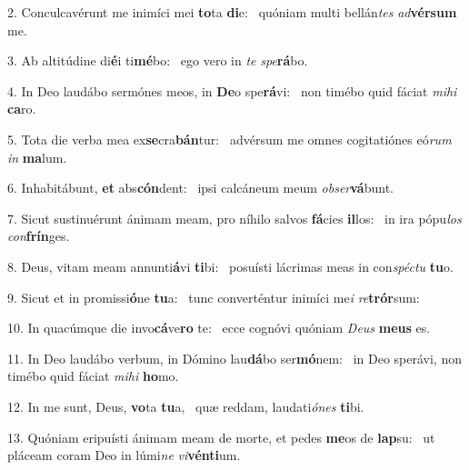 2. Conculcavérunt me inimíci mei \textbf{to}ta \textbf{di}e: \ast\  quóniam multi bellán\textit{tes} \textit{ad}\textbf{vér}\textbf{sum} me.\

3. Ab altitúdine di\textbf{é}i ti\textbf{mé}bo: \ast\  ego vero in \textit{te} \textit{spe}\textbf{rá}bo.\

4. In Deo laudábo sermónes meos, in \textbf{De}o spe\textbf{rá}vi: \ast\  non timébo quid fáciat \textit{mi}\textit{hi} \textbf{ca}ro.\

5. Tota die verba mea ex\textbf{se}cra\textbf{bán}tur: \ast\  advérsum me omnes cogitatiónes eó\textit{rum} \textit{in} \textbf{ma}lum.\

6. Inhabitábunt, \textbf{et} abs\textbf{cón}dent: \ast\  ipsi calcáneum meum \textit{ob}\textit{ser}\textbf{vá}bunt.\

7. Sicut sustinuérunt ánimam meam, pro níhilo salvos \textbf{fá}cies \textbf{il}los: \ast\  in ira pópu\textit{los} \textit{con}\textbf{frín}ges.\

8. Deus, vitam meam annunti\textbf{á}vi \textbf{ti}bi: \ast\  posuísti lácrimas meas in con\textit{spéc}\textit{tu} \textbf{tu}o.\

9. Sicut et in promissi\textbf{ó}ne \textbf{tu}a: \ast\  tunc converténtur inimíci me\textit{i} \textit{re}\textbf{trór}sum:\

10. In quacúmque die invo\textbf{cá}ve\textbf{ro} te: \ast\  ecce cognóvi quóniam \textit{De}\textit{us} \textbf{me}\textbf{us} es.\

11. In Deo laudábo verbum, in Dómino lau\textbf{dá}bo ser\textbf{mó}nem: \ast\  in Deo sperávi, non timébo quid fáciat \textit{mi}\textit{hi} \textbf{ho}mo.\

12. In me sunt, Deus, \textbf{vo}ta \textbf{tu}a, \ast\  quæ reddam, laudati\textit{ó}\textit{nes} \textbf{ti}bi.\

13. Quóniam eripuísti ánimam meam de morte, et pedes \textbf{me}os de \textbf{lap}su: \ast\  ut pláceam coram Deo in lúmi\textit{ne} \textit{vi}\textbf{vén}\textbf{ti}um.\


